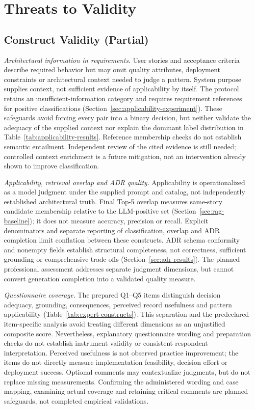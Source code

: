 \section{Threats to Validity}
\label{sec:threats-to-validity}

\subsection{Construct Validity (Partial)}
\label{sec:construct-validity}

\emph{Architectural information in requirements.}
User stories and acceptance criteria describe required behavior but may
omit quality attributes, deployment constraints or architectural context
needed to judge a pattern. System purpose supplies context, not sufficient
evidence of applicability by itself. The protocol retains an
insufficient-information category and requires requirement references for
positive classifications (Section~\ref{sec:applicability-experiment}).
These safeguards avoid forcing every pair into a binary decision, but
neither validate the adequacy of the supplied context nor explain the
dominant label distribution in Table~\ref{tab:applicability-results}.
Reference membership checks do not establish semantic entailment.
Independent review of the cited evidence is still needed; controlled
context enrichment is a future mitigation, not an intervention already
shown to improve classification.

\emph{Applicability, retrieval overlap and ADR quality.}
Applicability is operationalized as a model judgment under the supplied
prompt and catalog, not independently established architectural truth.
Final Top-5 overlap measures same-story candidate membership relative to
the LLM-positive set (Section~\ref{sec:rag-baseline}); it does not measure
accuracy, precision or recall. Explicit denominators and separate reporting
of classification, overlap and ADR completion limit conflation between
these constructs. ADR schema conformity and nonempty fields establish
structural completeness, not correctness, sufficient grounding or
comprehensive trade-offs (Section~\ref{sec:adr-results}).
The planned professional assessment addresses separate judgment dimensions,
but cannot convert generation completion into a validated quality measure.

\emph{Questionnaire coverage.}
The prepared Q1--Q5 items distinguish decision adequacy, grounding,
consequences, perceived record usefulness and pattern applicability
(Table~\ref{tab:expert-constructs}). This separation and the predeclared
item-specific analysis avoid treating different dimensions as an
unjustified composite score. Nevertheless, explanatory questionnaire
wording and preparation checks do not establish instrument validity or
consistent respondent interpretation. Perceived usefulness is not observed
practice improvement; the items do not directly measure implementation
feasibility, decision effort or deployment success.
Optional comments may contextualize judgments, but do not replace missing
measurements. Confirming the administered wording and case mapping,
examining actual coverage and retaining critical comments are planned
safeguards, not completed empirical validations.

